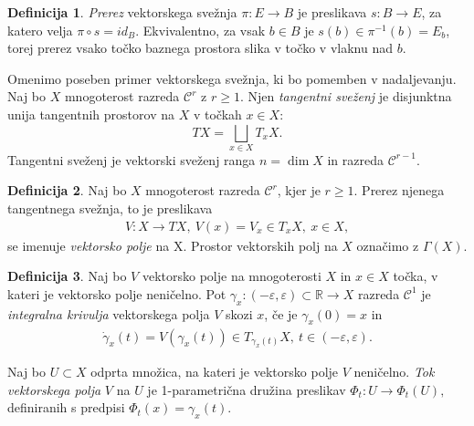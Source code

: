 \documentclass[12pt,a4paper,twoside]{article}
\theoremstyle{definition} %
\newtheorem{definicija}{Definicija}[section]
\theoremstyle{plain} %
\numberwithin{equation}{section}  %
\newcommand{\R}{\mathbb R}
\begin{document}
\begin{definicija}
\emph{Prerez} vektorskega svežnja $\pi \colon E \to B$ je preslikava $s \colon B \to E$, za katero velja $\pi \circ s = id_{B}$.
Ekvivalentno, za vsak $b \in B$ je $s(b) \in \pi^{-1}(b) = E_{b}$, torej prerez vsako točko baznega prostora slika v točko v vlaknu nad $b$.
\end{definicija}

Omenimo poseben primer vektorskega svežnja, ki bo pomemben v nadaljevanju. Naj bo $X$ mnogoterost razreda $\mathcal{C}^{r}$ z $r \geq 1$. Njen \emph{tangentni sveženj} je disjunktna unija tangentnih prostorov na $X$ v točkah $x \in X$:
\[ TX = \bigsqcup_{x \in X} T_{x}X. \]
Tangentni sveženj je vektorski sveženj ranga $n = \dim X$ in razreda $\mathcal{C}^{r-1}$.

\begin{definicija}
Naj bo $X$ mnogoterost razreda $\mathcal{C}^{r}$, kjer je $r \geq 1$. Prerez njenega tangentnega svežnja, to je preslikava 
\begin{align*}
V \colon X \to TX, \ V(x) = V_{x} \in T_{x}X, \ x \in X,
\end{align*}
se imenuje \emph{vektorsko polje} na X. Prostor vektorskih polj na $X$ označimo z $\Gamma (X)$.
\end{definicija}

\begin{definicija}
Naj bo $V$ vektorsko polje na mnogoterosti $X$ in $x \in X$ točka, v kateri je vektorsko polje neničelno. Pot $\gamma_{x} \colon (-\varepsilon, \varepsilon) \subset \R \to X$ razreda $\mathcal{C}^{1}$ je \emph{integralna krivulja} vektorskega polja $V$ skozi $x$, če je $\gamma_{x}(0) = x$ in
\begin{align*}
\dot{\gamma}_{x} (t) = V(\gamma _{x}(t)) \in T_{\gamma _{x}(t)}X, \ t \in (-\varepsilon, \varepsilon).
\end{align*}

Naj bo $U \subset X$ odprta množica, na kateri je vektorsko polje $V$ neničelno. \emph{Tok vektorskega polja} $V$ na $U$ je 1-parametrična družina preslikav
$ \Phi_{t} \colon U \to \Phi_{t}(U),$ definiranih s predpisi $\Phi_{t}(x) = \gamma_{x}(t)$.
\end{definicija}
\end{document}
